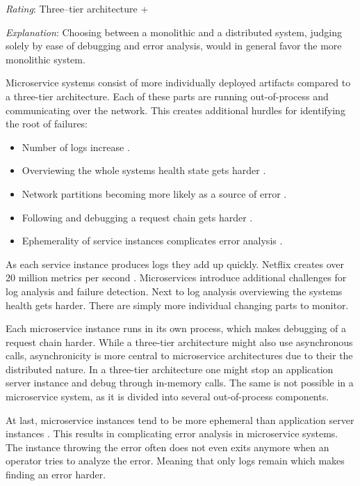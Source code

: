 \textit{Rating}: Three--tier architecture +

\textit{Explanation}:
Choosing between a monolithic and a distributed system, judging solely by ease of debugging and error analysis, would in general favor the more monolithic system.

Microservice systems consist of more individually deployed artifacts compared to a three-tier architecture. 
Each of these parts are running out-of-process and communicating over the network.
This creates additional hurdles for identifying the root of failures:
\begin{itemize}
\item Number of logs increase \citep[p. 158]{Newman2015}.
\item Overviewing the whole systems health state gets harder \citep{Cockcroft2014}.
\item Network partitions becoming more likely as a source of error \citep[p. 65]{Wolff2016}.
\item Following and debugging a request chain gets harder \citep[p. 162]{Newman2015}.
\item Ephemerality of service instances complicates error analysis \citep{Cockcroft2014}.
\end{itemize}

As each service instance produces logs they add up quickly.
Netflix creates over 20 million metrics per second \citep[27:00]{NetflixMSAtScale2016}.
Microservices introduce additional challenges for log analysis and failure detection. 
Next to log analysis overviewing the systems health gets harder. 
There are simply more individual changing parts to monitor.

Each microservice instance runs in its own process, which makes debugging of a request chain harder.
While a three-tier architecture might also use asynchronous calls, asynchronicity is more central to microservice architectures due to their the distributed nature.
In a three-tier architecture one might stop an application server instance and debug through in-memory calls.
The same is not possible in a microservice system, as it is divided into several out-of-process components.

At last, microservice instances tend to be more ephemeral than application server instances \cite{Cockcroft2014}.
This results in complicating error analysis in microservice systems.
The instance throwing the error often does not even exits anymore when an operator tries to analyze the error.
Meaning that only logs remain which makes finding an error harder.

